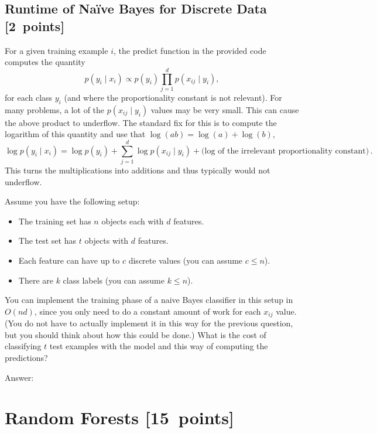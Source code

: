 \documentclass{article}
\newcommand{\blu}[1]{{\textcolor{blu}{#1}}}
\newenvironment{answer}{\par\begingroup\color{gre}Answer: }{\endgroup}
\let\ask\blu
\newcommand\pts[1]{\textcolor{pointscolour}{[#1~points]}}
\begin{document}
    \clearpage
    \subsection{Runtime of Na\"ive Bayes for Discrete Data \pts{2}}

    For a given training example $i$, the predict function in the provided code computes the quantity
    \[
    p(y_i \mid x_i) \propto p(y_i)\prod_{j=1}^d p(x_{ij} \mid y_i),
    \]
    for each class $y_i$ (and where the proportionality constant is not relevant). For many problems, a lot of the $p(x_{ij} \mid y_i)$ values may be very small. This can cause the above product to underflow. The standard fix for this is to compute the logarithm of this quantity and use that $\log(ab) = \log(a)+\log(b)$,
    \[
    \log p(y_i \mid x_i) = \log p(y_i) + \sum_{j=1}^d \log p(x_{ij} \mid y_i) + \text{(log of the irrelevant proportionality constant)} \, .
    \]
    This turns the multiplications into additions and thus typically would not underflow.

    Assume you have the following setup:
    \begin{itemize}
        \item The training set has $n$ objects each with $d$ features.
        \item The test set has $t$ objects with $d$ features.
        \item Each feature can have up to $c$ discrete values (you can assume $c \leq n$).
        \item There are $k$ class labels (you can assume $k \leq n$).
    \end{itemize}
    You can implement the training phase of a naive Bayes classifier in this setup in $O(nd)$, since you only need to do a constant amount of work for each $x_{ij}$ value. (You do not have to actually implement it in this way for the previous question, but you should think about how this could be done.)
    \ask{What is the cost of classifying $t$ test examples with the model and this way of computing the predictions?}
    \begin{answer}

    \end{answer}

    \clearpage
    \section{Random Forests \pts{15}}
\end{document}
